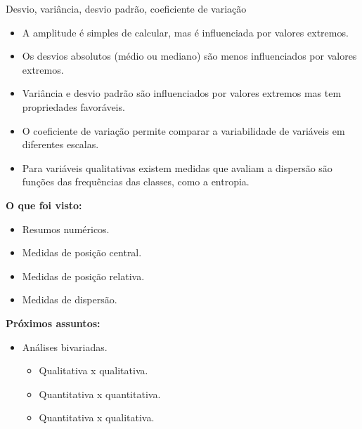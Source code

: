 \documentclass[
  ignorenonframetext,
  serif,
  professionalfont,
  usenames,
  dvipsnames,
  aspectratio = 169]{beamer}
\providecommand{\tightlist}{%
  \setlength{\itemsep}{0pt}\setlength{\parskip}{0pt}}
\renewcommand{\tightlist}{%
  \setlength{\itemsep}{0\baselineskip}
  \setlength{\parskip}{0.25\baselineskip}
}
\def\beginAHalfColumn{\begin{minipage}{0.49\textwidth}}%
\def\endColumns{\end{minipage}}%
\begin{document}
\begin{frame}{Desvio, variância, desvio padrão, coeficiente de variação}
\protect\hypertarget{desvio-variuxe2ncia-desvio-padruxe3o-coeficiente-de-variauxe7uxe3o}{}
\begin{itemize}
\item
  A amplitude é simples de calcular, mas é influenciada por valores
  extremos.
\item
  Os desvios absolutos (médio ou mediano) são menos influenciados por
  valores extremos.
\item
  Variância e desvio padrão são influenciados por valores extremos mas
  tem propriedades favoráveis.
\item
  O coeficiente de variação permite comparar a variabilidade de
  variáveis em diferentes escalas.
\item
  Para variáveis qualitativas existem medidas que avaliam a dispersão
  são funções das frequências das classes, como a entropia.
\end{itemize}
\end{frame}

\begin{frame}{}
\protect\hypertarget{section}{}
\beginAHalfColumn

\textbf{O que foi visto:}

\begin{itemize}
\tightlist
\item
  Resumos numéricos.
\item
  Medidas de posição central.
\item
  Medidas de posição relativa.
\item
  Medidas de dispersão.
\end{itemize}

\endColumns
\beginAHalfColumn

\textbf{Próximos assuntos:}

\begin{itemize}
\tightlist
\item
  Análises bivariadas.

  \begin{itemize}
  \tightlist
  \item
    Qualitativa x qualitativa.
  \item
    Quantitativa x quantitativa.
  \item
    Quantitativa x qualitativa.
  \end{itemize}
\end{itemize}

\endColumns
\end{frame}
\end{document}
